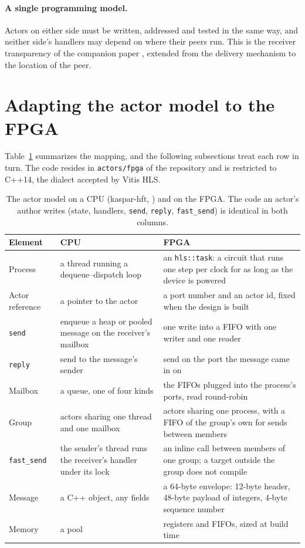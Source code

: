 \documentclass[11pt]{article}
\newcommand{\fs}{\texttt{fast\_send}}
\newcommand{\snd}{\texttt{send}}
\begin{document}
\paragraph{A single programming model.} Actors on either side must be written,
addressed and tested in the same way, and neither side's handlers may depend on
where their peers run. This is the receiver transparency of the companion paper
\cite{fastsend}, extended from the delivery mechanism to the location of the
peer.

\section{Adapting the actor model to the FPGA}
\label{sec:fpga}

Table~\ref{tab:contrast} summarizes the mapping, and the following subsections
treat each row in turn. The code resides in \texttt{actors/fpga} of the
repository and is restricted to C++14, the dialect accepted by Vitis HLS.

\begin{table}[h]
\centering
\caption{The actor model on a CPU (kaspar-hft, \cite{fastsend}) and on the
FPGA. The code an actor's author writes (state, handlers, \snd{},
\texttt{reply}, \fs{}) is identical in both columns.}
\label{tab:contrast}
\small
\begin{tabular}{p{2.4cm} p{5.0cm} p{5.6cm}}
\toprule
Element & CPU & FPGA \\
\midrule
Process & a thread running a dequeue--dispatch loop & an \texttt{hls::task}: a circuit that runs one step per clock for as long as the device is powered \\
Actor reference & a pointer to the actor & a port number and an actor id, fixed when the design is built \\
\snd{} & enqueue a heap or pooled message on the receiver's mailbox & one write into a FIFO with one writer and one reader \\
\texttt{reply} & send to the message's sender & send on the port the message came in on \\
Mailbox & a queue, one of four kinds & the FIFOs plugged into the process's ports, read round-robin \\
Group & actors sharing one thread and one mailbox & actors sharing one process, with a FIFO of the group's own for sends between members \\
\fs{} & the sender's thread runs the receiver's handler under its lock & an inline call between members of one group; a target outside the group does not compile \\
Message & a C++ object, any fields & a 64-byte envelope: 12-byte header, 48-byte payload of integers, 4-byte sequence number \\
Memory & a pool & registers and FIFOs, sized at build time \\
\bottomrule
\end{tabular}
\end{table}
\end{document}
